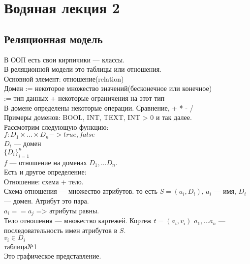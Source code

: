 \section*{Водяная лекция 2
}

\subsection*{Реляционная модель
}

\noindent В ООП есть свои кирпичики — классы. \\
\noindent В реляционной модели это таблицы или отношения. \\

\noindent Основной элемент: отношение(relation) \\

\noindent Домен := некоторое множество значений(бесконечное или конечное) \\
\indent:= тип данных + некоторые ограничения на этот тип
\\
\noindent В домене определены некоторые операции. Сравнение, + * - / \\

\noindent Примеры доменов: BOOL, INT, TEXT, INT > 0 и так далее. \\


\noindent Рассмотрим следующую функцию:  \\
\noindent $f: D_1 \times
 … \times
 D_n -> true, false$ \\
\noindent $D_i$ — домен \\
\noindent $\{D_i\}_{i = 1}^n$ \\

\noindent $f$ — отношение на доменах $D_1, … D_n$. \\

\noindent Есть и другое определение: \\
\noindent Отношение: схема + тело. \\
\noindent Схема отношения — множество атрибутов. то есть $S = {(a_i, D_i)}$, $a_i$ — имя, $D_i$ — домен. Атрибут это пара. \\
\noindent $a_i == a_j$ => атрибуты равны. \\
\noindent Тело отношения — множество картежей. Кортеж $t = {(a_i, v_i)}$ $a_1, … a_n$ — последовательность имен атрибутов в $S$. \\
\noindent $v_i \in D_i$ \\

\noindent таблица№1 \\
\noindent Это графическое представление. \\

